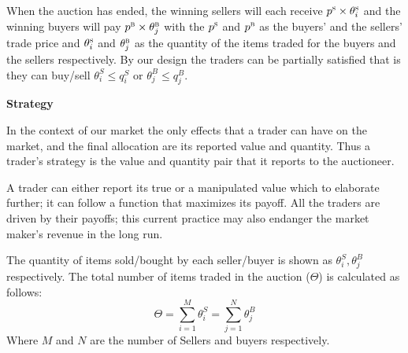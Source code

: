 When the auction has ended, the winning sellers will each receive $p^{\textsc{s}} \times \theta_{i}^\textsc{s}$ and the winning buyers will pay $p^{\textsc{b}} \times \theta_{j}^\textsc{b}$ with the $p^{\textsc{s}}$ and $p^{\textsc{b}}$ as the buyers' and the sellers' trade price and $\theta_{i}^\textsc{s}$ and $\theta_{j}^\textsc{b}$ as the quantity of the items traded for the buyers and the sellers respectively. By our design the traders can be partially satisfied that is they can buy/sell $\theta_i^S \leq q_i^S$ or $\theta_j^B \leq q_j^B$.

\begin{Definition}
\label{def_strategy}
\textbf{Strategy} 

In the context of our market the only effects that a trader can have on the market, and the final allocation are its reported value and quantity. Thus a trader's strategy is the value and quantity pair that it reports to the auctioneer.
\end{Definition}
A trader can either report its true or a manipulated value which to elaborate further; it can follow a function that maximizes its payoff. All the traders are driven by their payoffs; this current practice may also endanger the market maker's revenue in the long run.

The quantity of items sold/bought by each seller/buyer is shown as $\theta_i^S, \theta_j^B$ respectively. The total number of items traded in the auction ($\Theta$) is calculated as follows:
\begin{equation}
\label{Thetha}
\Theta = \sum_{i=1}^{M} \theta_i^S = \sum_{j=1}^{N} \theta_j^B
\end{equation}
Where $M$ and $N$ are the number of Sellers and buyers respectively.

